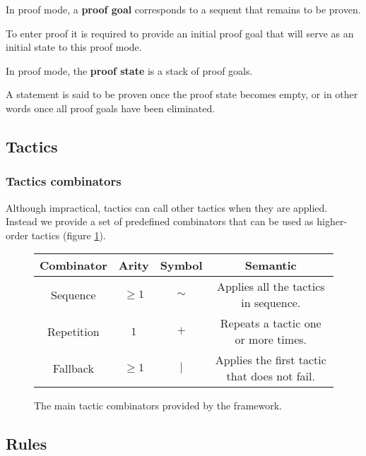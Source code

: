 \begin{definition}
In proof mode, a \textbf{proof goal} corresponds to a sequent that remains to be proven.
\end{definition}

To enter proof it is required to provide an initial proof goal that will serve as an initial state to this proof mode.

\begin{definition}
In proof mode, the \textbf{proof state} is a stack of proof goals.
\end{definition}

A statement is said to be proven once the proof state becomes empty, or in other words once all proof goals have been eliminated.

\subsection{Tactics}

\subsubsection{Tactics combinators}

Although impractical, tactics can call other tactics when they are applied. Instead we provide a set of predefined combinators that can be used as higher-order tactics (figure \ref{fig:tactics-combinators}).

\begin{figure}[hbt!]
  \centering
  \begin{tabular}{||c c c c||}
  \hline
  \textbf{Combinator} & \textbf{Arity} & \textbf{Symbol} & \textbf{Semantic} \\
  \hline\hline
  Sequence & $\geq 1$ & $\sim$ & Applies all the tactics in sequence. \\ \hline
  Repetition & $1$ & $+$ & Repeats a tactic one or more times. \\ \hline
  Fallback & $\geq 1$ & $|$ & Applies the first tactic that does not fail. \\ \hline
  \end{tabular}
  \caption[Available combinators]{The main tactic combinators provided by the framework.}
  \label{fig:tactics-combinators}
\end{figure}

\subsection{Rules}


